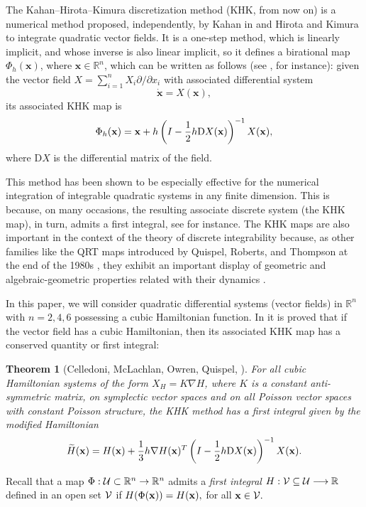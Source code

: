 \documentclass[11pt]{article}
\newtheorem {theorem} {Theorem}%
\newcommand{\R}{{\mathbb R}}
\newcommand{\V}{{\cal{V}}}
\newcommand{\U}{{\cal{U}}}
\begin{document}
The Kahan--Hirota--Kimura discretization method (KHK, from now on) is a numerical method proposed, independently, by Kahan in \cite{kahan1993,KL97} and Hirota and Kimura \cite{hirota2000,kimura2000} to integrate quadratic vector fields. It is a one-step method, which is linearly implicit, and whose inverse is also linear implicit, so it defines a birational map $\Phi_h(\mathbf{x})$, where $\mathbf{x}\in\mathbb{R}^n$, which can be written as follows (see \cite{Celledoni2013}, for instance): given the vector field $X=\sum_{i=1}^n X_i\partial/\partial x_i$ with associated differential system
$$
\dot{\mathbf{x}}=X(\mathbf{x}),
$$
its associated KHK map is
\begin{equation}\label{e:phi}
\Phi_h(\mathbf{x})=\mathbf{x}+h\left(I-\frac{1}{2}h {\mathrm D}X({\bf{x}})\right)^{-1} X({\bf{x}}),
\end{equation}
where ${\mathrm D}X$ is the differential matrix of the field.


This method has been shown to be especially effective for the numerical integration of integrable quadratic systems in any finite dimension. This is because, on many occasions, the resulting associate discrete system (the KHK map), in turn, admits a first integral, see  \cite{Celledoni2013,Celledoni2019b} for instance. The
KHK maps are also important in the context of the theory of discrete integrability because, as other families like the QRT maps  introduced by Quispel, Roberts, and Thompson at the end of the 1980s \cite{QRT1,QRT2},  they exhibit an important display of geometric and algebraic-geometric properties related with their dynamics \cite{ASW,Celledoni2013,Celledoni2014,Cel17,
Celledoni2019b,
Kam19,Petrera2011,Petrera19-1,PS10,Petrera19-2,Petrera19-3,PZ17}.



In this paper, we will consider quadratic differential systems (vector fields) in $\R^n$  with $n=2,4,6$ possessing a cubic Hamiltonian function.  In \cite{Celledoni2013} it is proved that if the vector field has a cubic Hamiltonian, then its associated KHK map has a conserved quantity or first integral:

\begin{theorem}[Celledoni, McLachlan, Owren, Quispel, \cite{Celledoni2013}]\label{t:teoham}
For all cubic Hamiltonian systems of the form $X_H=K\nabla H$, where $K$ is a constant anti-symmetric matrix, on symplectic vector spaces and on all Poisson vector spaces with constant Poisson structure,
the KHK method has a first integral given by the modified Hamiltonian
\begin{equation}\label{e:modHam}
 \widetilde{H}({\bf{x}})=H({\bf{x}})+\frac{1}{3}h\nabla H({\bf{x}})^T\left(I-\frac{1}{2}h {\mathrm D}X({\bf{x}})\right)^{-1} X({\bf{x}}).
\end{equation}



\end{theorem}
Recall that a map $\Phi: \U\subset\R^n\rightarrow \R^n$ admits a \emph{first integral}  $H:\V\subseteq \U\longrightarrow \mathbb{R}$  defined in an open set $\V$ if $H(\Phi({\bf{x}}))=H({\bf{x}}),$ for all ${\bf{x}}\in \V.$
\end{document}
